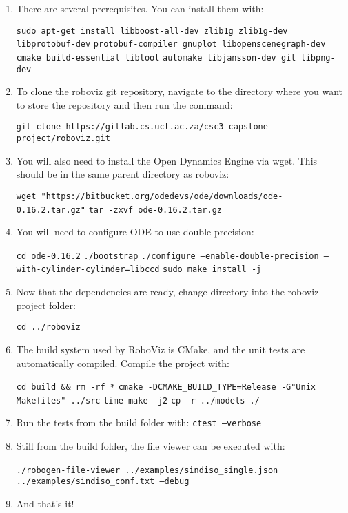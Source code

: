 \begin{enumerate}
    \item There are several prerequisites. You can install them with:

    \texttt{sudo apt-get install libboost-all-dev zlib1g zlib1g-dev libprotobuf-dev}
    \texttt{protobuf-compiler gnuplot libopenscenegraph-dev cmake build-essential libtool}
    \texttt{automake libjansson-dev git libpng-dev}
    \item To clone the roboviz git repository, navigate to the directory where
        you want to store the repository and then run the command:

        \texttt{git clone https://gitlab.cs.uct.ac.za/csc3-capstone-project/roboviz.git}
    \item You will also need to install the Open Dynamics Engine via wget. This
        should be in the same parent directory as roboviz:

        \texttt{wget "https://bitbucket.org/odedevs/ode/downloads/ode-0.16.2.tar.gz"}
        \texttt{tar -zxvf ode-0.16.2.tar.gz}

    \item You will need to configure ODE to use double precision:

        \texttt{cd ode-0.16.2}
        \texttt{./bootstrap}
        \texttt{./configure --enable-double-precision --with-cylinder-cylinder=libccd}
        \texttt{sudo make install -j}
    \item Now that the dependencies are ready, change directory into the
        roboviz project folder:

        \texttt{cd ../roboviz}
    \item The build system used by RoboViz is CMake, and the unit tests are
        automatically compiled. Compile the project with:

        \texttt{cd build \&\& rm -rf *}
        \texttt{cmake -DCMAKE\_BUILD\_TYPE=Release -G"Unix Makefiles" ../src}
        \texttt{time make -j2}
        \texttt{cp -r ../models ./}

    \item  Run the tests from the build folder with:
        \texttt{ctest --verbose}

    \item Still from the build folder, the file viewer can be executed with:

        \texttt{./robogen-file-viewer ../examples/sindiso\_single.json }
        \texttt{        ../examples/sindiso\_conf.txt --debug}
    \item And that's it!
\end{enumerate}


